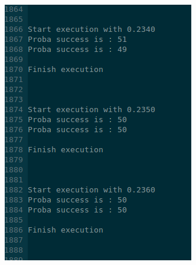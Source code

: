 \begin{figure}
\begin{subfigure}[b]{0.3\textwidth}
        \includegraphics[width=\textwidth]{img/code2.png}
        \label{fig:tiger}
    \end{subfigure}
    ~ %
    \begin{subfigure}[b]{0.3\textwidth}

\end{subfigure}
\end{figure}
